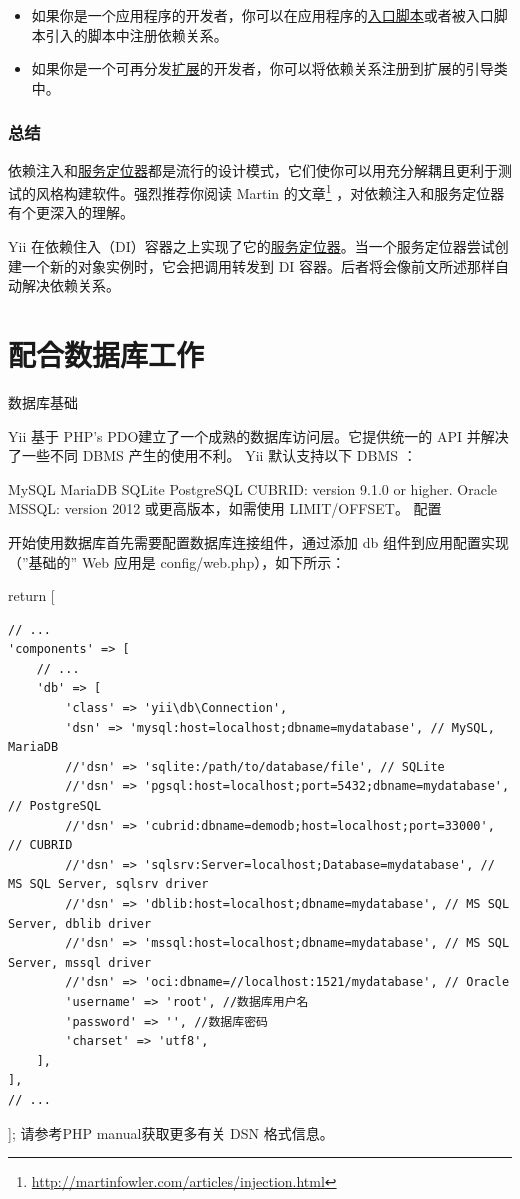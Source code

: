 \begin{itemize}
\item 如果你是一个应用程序的开发者，你可以在应用程序的\hyperref[structure-entry-scripts.md]{入口脚本}或者被入口脚本引入的脚本中注册依赖关系。
\item 如果你是一个可再分发\hyperref[structure-extensions.md]{扩展}的开发者，你可以将依赖关系注册到扩展的引导类中。
\end{itemize}
\subsection{总结 \label{concept-di-container.md::summary}}
依赖注入和\hyperref[concept-service-locator.md]{服务定位器}都是流行的设计模式，它们使你可以用充分解耦且更利于测试的风格构建软件。强烈推荐你阅读 Martin 的文章\footnote{\url{http://martinfowler.com/articles/injection.html}} ，对依赖注入和服务定位器有个更深入的理解。

Yii 在依赖住入（DI）容器之上实现了它的\hyperref[concept-service-locator.md]{服务定位器}。当一个服务定位器尝试创建一个新的对象实例时，它会把调用转发到 DI 容器。后者将会像前文所述那样自动解决依赖关系。



\chapter{配合数据库工作}
\label{db-dao.md}数据库基础

Yii 基于 PHP's PDO建立了一个成熟的数据库访问层。它提供统一的 API 并解决了一些不同 DBMS 产生的使用不利。 Yii 默认支持以下 DBMS ：

MySQL
MariaDB
SQLite
PostgreSQL
CUBRID: version 9.1.0 or higher.
Oracle
MSSQL: version 2012 或更高版本，如需使用 LIMIT/OFFSET。
配置

开始使用数据库首先需要配置数据库连接组件，通过添加 db 组件到应用配置实现（''基础的'' Web 应用是 config/web.php），如下所示：

return [

\begin{lstlisting}
// ...
'components' => [
    // ...
    'db' => [
        'class' => 'yii\db\Connection',
        'dsn' => 'mysql:host=localhost;dbname=mydatabase', // MySQL, MariaDB
        //'dsn' => 'sqlite:/path/to/database/file', // SQLite
        //'dsn' => 'pgsql:host=localhost;port=5432;dbname=mydatabase', // PostgreSQL
        //'dsn' => 'cubrid:dbname=demodb;host=localhost;port=33000', // CUBRID
        //'dsn' => 'sqlsrv:Server=localhost;Database=mydatabase', // MS SQL Server, sqlsrv driver
        //'dsn' => 'dblib:host=localhost;dbname=mydatabase', // MS SQL Server, dblib driver
        //'dsn' => 'mssql:host=localhost;dbname=mydatabase', // MS SQL Server, mssql driver
        //'dsn' => 'oci:dbname=//localhost:1521/mydatabase', // Oracle
        'username' => 'root', //数据库用户名
        'password' => '', //数据库密码
        'charset' => 'utf8',
    ],
],
// ...
\end{lstlisting}
];
请参考PHP manual获取更多有关 DSN 格式信息。

